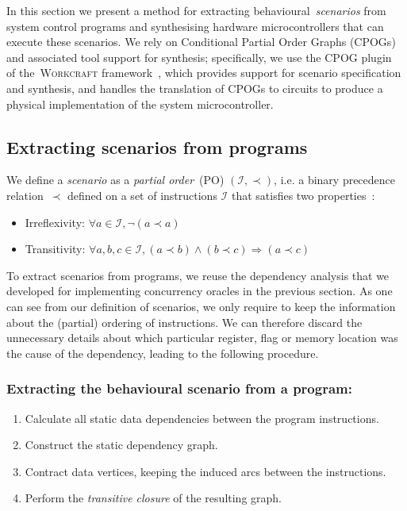 In this section we present a method for extracting behavioural~\emph{scenarios}
from system control programs and synthesising hardware microcontrollers that can
execute these scenarios. We rely on Conditional Partial Order Graphs
(CPOGs)~\cite{CPOG} and associated tool support for synthesis; specifically, we
use the CPOG plugin~\cite{scenco-tool} of the~\textsc{Workcraft}
framework~\cite{workcraft-tool}, which provides support for scenario
specification and synthesis, and handles the translation of CPOGs to circuits
to produce a physical implementation of the system microcontroller.

\subsection{Extracting scenarios from programs}

We define a \textit{scenario} as a \textit{partial order}~(PO)
$(\mathcal{I},\prec)$, i.e. a binary precedence relation~$\prec$ defined on a
set of instructions $\mathcal{I}$ that satisfies two properties~\cite{PO}:

\begin{itemize}
    \item Irreflexivity: $\forall a \in \mathcal{I}, \neg(a \prec a)$
    \vspace{+1mm}
    \item Transitivity: $\forall a, b, c \in \mathcal{I}, (a \prec b) \wedge (b
    \prec c) \Rightarrow (a \prec c)$
\end{itemize}

To extract scenarios from programs, we reuse the dependency analysis that we
developed for implementing concurrency oracles in the previous section. As one
can see from our definition of scenarios, we only require to keep the
information about the (partial) ordering of instructions. We can therefore
discard the unnecessary details about which particular register, flag or memory
location was the cause of the dependency, leading to the following procedure.

\subsubsection{Extracting the behavioural scenario from a program:}
\begin{enumerate}
    \item Calculate all static data dependencies between the program instructions.
    \item Construct the static dependency graph.
    \item Contract data vertices, keeping the induced arcs between the instructions.
    \item Perform the \emph{transitive closure} of the resulting graph.
\end{enumerate}

